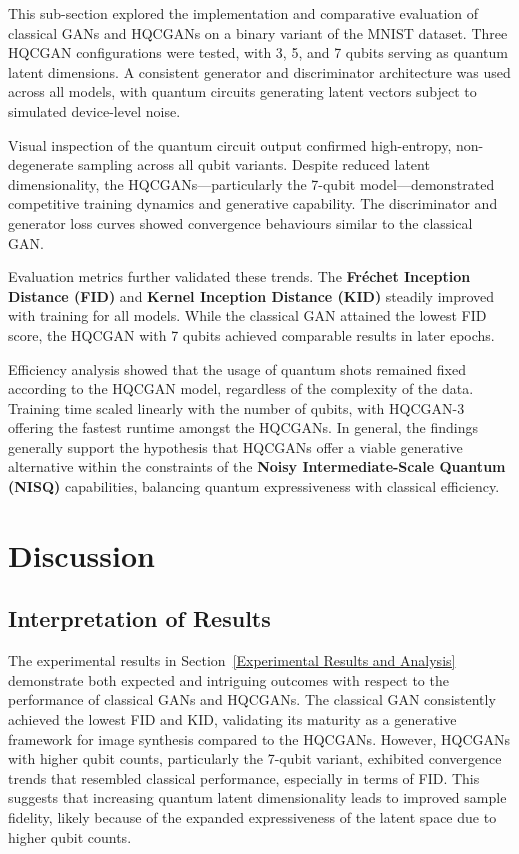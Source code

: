 \documentclass[conference]{IEEEtran}
\begin{document}
This sub-section explored the implementation and comparative evaluation of classical GANs and HQCGANs on a binary variant of the MNIST dataset. Three HQCGAN configurations were tested, with 3, 5, and 7 qubits serving as quantum latent dimensions. A consistent generator and discriminator architecture was used across all models, with quantum circuits generating latent vectors subject to simulated device-level noise.

Visual inspection of the quantum circuit output confirmed high-entropy, non-degenerate sampling across all qubit variants. Despite reduced latent dimensionality, the HQCGANs—particularly the 7-qubit model—demonstrated competitive training dynamics and generative capability. The discriminator and generator loss curves showed convergence behaviours similar to the classical GAN.

Evaluation metrics further validated these trends. The \textbf{Fréchet Inception Distance (FID)} and \textbf{Kernel Inception Distance (KID)} steadily improved with training for all models. While the classical GAN attained the lowest FID score, the HQCGAN with 7 qubits achieved comparable results in later epochs.

Efficiency analysis showed that the usage of quantum shots remained fixed according to the HQCGAN model, regardless of the complexity of the data. Training time scaled linearly with the number of qubits, with HQCGAN-3 offering the fastest runtime amongst the HQCGANs. In general, the findings generally support the hypothesis that HQCGANs offer a viable generative alternative within the constraints of the \textbf{Noisy Intermediate-Scale Quantum (NISQ)} capabilities, balancing quantum expressiveness with classical efficiency.

\section{Discussion}

\subsection{Interpretation of Results}

The experimental results in Section~\ref{Experimental Results and Analysis} demonstrate both expected and intriguing outcomes with respect to the performance of classical GANs and HQCGANs. The classical GAN consistently achieved the lowest FID and KID, validating its maturity as a generative framework for image synthesis compared to the HQCGANs. However, HQCGANs with higher qubit counts, particularly the 7-qubit variant, exhibited convergence trends that resembled classical performance, especially in terms of FID. This suggests that increasing quantum latent dimensionality leads to improved sample fidelity, likely because of the expanded expressiveness of the latent space due to higher qubit counts.
\end{document}
